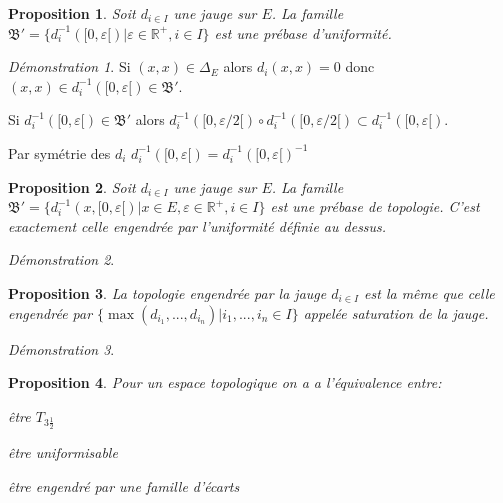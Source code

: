 \documentclass[a4paper, 11pt, french]{book}
\newenvironment{itemise}{\itemize}{\enditemize}
\theoremstyle{plain} %
\newtheorem{proposition}{Proposition}
\theoremstyle{definition} %
\theoremstyle{remark} %
\newtheorem*{demonstration}{Démonstration}
\newcommand{\1}{\mathds{1}}
\newcommand{\inv}[1]{#1^{-1}}
\newcommand{\R}{\mathbb{R}}
\begin{document}
\begin{proposition}
	Soit $d_{i\in I}$ une jauge sur $E$.
	La famille $\mathfrak{B}'=\{\inv{d_i}([0, \varepsilon[)|\varepsilon\in\R^+, i\in I\}$ est une prébase d'uniformité.
\end{proposition}

\begin{demonstration}
	\begin{itemise}
		\item Si $(x, x)\in\Delta_E$ alors $d_i(x, x)=0$ donc $(x, x)\in\inv{d_i}([0, \varepsilon[)\in\mathfrak{B}'$.
		\item Si $\inv{d_i}([0, \varepsilon[)\in\mathfrak{B}'$ alors $\inv{d_i}([0, \varepsilon/2[)\circ \inv{d_i}([0, \varepsilon/2[)\subset\inv{d_i}([0, \varepsilon[)$.
		\item Par symétrie des $d_i$ $\inv{d_i}([0, \varepsilon[)=\inv{\inv{d_i}([0, \varepsilon[)}$
	\end{itemise}
\end{demonstration}

\begin{proposition}
	Soit $d_{i\in I}$ une jauge sur $E$.
	La famille $\mathfrak{B}'=\{\inv{d_i}(x, [0, \varepsilon[)|x\in E, \varepsilon\in\R^+, i\in I\}$ est une prébase de topologie.
	C'est exactement celle engendrée par l'uniformité définie au dessus.
\end{proposition}

\begin{demonstration}
\end{demonstration}

\begin{proposition}
	La topologie engendrée par la jauge $d_{i\in I}$ est la même que celle engendrée par $\{\max(d_{i_1}, ..., d_{i_n})|i_1, ..., i_n\in I\}$ appelée saturation de la jauge.
\end{proposition}

\begin{demonstration}
\end{demonstration}

\begin{proposition}
	Pour un espace topologique on a a l'équivalence entre:
	\begin{itemise}
		\item être $T_{3\frac{1}{2}}$
		\item être uniformisable
		\item être engendré par une famille d'écarts
	\end{itemise}
\end{proposition}
\end{document}
